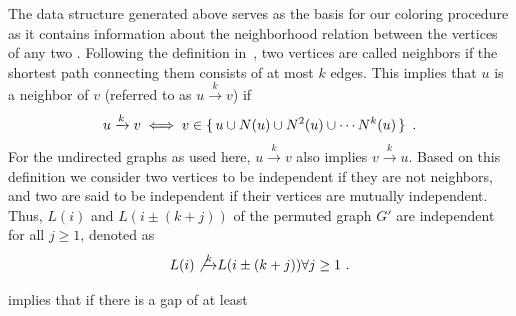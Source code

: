 The data structure generated above serves as the basis for our \DK coloring
procedure as it contains information about the neighborhood relation
between the vertices of any two \levels. Following the definition
in~\cite{dist_k_def}, two vertices are called \DK neighbors if the
shortest path connecting them consists of at most $k$ edges.
This implies that $u$ is a \DK neighbor of $v$ (referred to as
$u\xrightarrow{k}v$) if
\begin{equation}\label{eq:dk}
  u\xrightarrow{k}v  \iff  v \in \set{ u \cup N(u) \cup N^2(u) \cup \cdots N^k(u) }~.
\end{equation}
For the undirected graphs as used here, $u\xrightarrow{k}v$
also implies $v\xrightarrow{k}u$. Based on this definition we consider
two vertices to be \DK independent if they are not \DK
neighbors, and two \levels are said to be \DK independent 
if their vertices are mutually \DK independent.
Thus, \levels $L(i)$ and $L(i\pm(k+j))$ of the permuted
graph $G'$ are \DK independent for all $j\geq1$, denoted as
\begin{equation}\label{corollary_dk}
	L(i) \not{\xrightarrow{k}} L(i\pm(k+j)) \forall j\geq1 ~.
\end{equation} 

 implies that if there is a gap of at least
